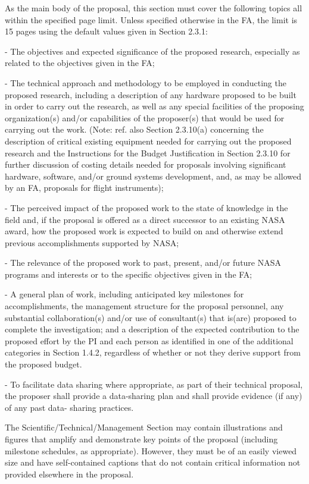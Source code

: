 \documentclass[12pt]{article}
\begin{document}
As the main body of the proposal, this section must cover the
following topics all within the specified page limit. Unless specified
otherwise in the FA, the limit is 15 pages using the default values
given in Section 2.3.1:

- The objectives and expected significance of the proposed research,
  especially as related to the objectives given in the FA;

- The technical approach and methodology to be employed in conducting
  the proposed research, including a description of any hardware
  proposed to be built in order to carry out the research, as well as
  any special facilities of the proposing organization(s) and/or
  capabilities of the proposer(s) that would be used for carrying out
  the work. (Note: ref. also Section 2.3.10(a) concerning the
  description of critical existing equipment needed for carrying out
  the proposed research and the Instructions for the Budget
  Justification in Section 2.3.10 for further discussion of costing
  details needed for proposals involving significant hardware,
  software, and/or ground systems development, and, as may be allowed
  by an FA, proposals for flight instruments);

- The perceived impact of the proposed work to the state of knowledge
  in the field and, if the proposal is offered as a direct successor
  to an existing NASA award, how the proposed work is expected to
  build on and otherwise extend previous accomplishments supported by
  NASA;

- The relevance of the proposed work to past, present, and/or future
  NASA programs and interests or to the specific objectives given in
  the FA;

- A general plan of work, including anticipated key milestones for
  accomplishments, the management structure for the proposal
  personnel, any substantial collaboration(s) and/or use of
  consultant(s) that is(are) proposed to complete the investigation;
  and a description of the expected contribution to the proposed
  effort by the PI and each person as identified in one of the
  additional categories in Section 1.4.2, regardless of whether or not
  they derive support from the proposed budget.

- To facilitate data sharing where appropriate, as part of their
  technical proposal, the proposer shall provide a data-sharing plan
  and shall provide evidence (if any) of any past data- sharing
  practices.

The Scientific/Technical/Management Section may contain illustrations
and figures that amplify and demonstrate key points of the proposal
(including milestone schedules, as appropriate). However, they must be
of an easily viewed size and have self-contained captions that do not
contain critical information not provided elsewhere in the proposal.
\end{document}
